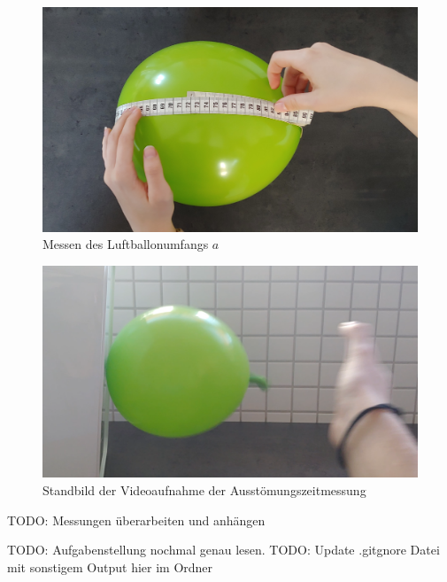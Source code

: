 \documentclass{article}
\begin{document}
    \printbibliography[title={Quellen}]

    \begin{figure}[h!]\label{fig:Umfang}
        \centering
        \includegraphics[width=\textwidth]{luftballon_umfang_messung.jpg}
        \caption{Messen des Luftballonumfangs \(a\)}
    \end{figure}

    \begin{figure}[h!]\label{fig:Festgeklebt}
        \centering
        \includegraphics[width=\textwidth]{lufballon_festgeklebt.png}
        \caption{Standbild der Videoaufnahme der Ausstömungszeitmessung}
    \end{figure}

    TODO: Messungen überarbeiten und anhängen

    TODO: Aufgabenstellung nochmal genau lesen.
    TODO: Update .gitgnore Datei mit sonstigem Output hier im Ordner
    
\end{document}
